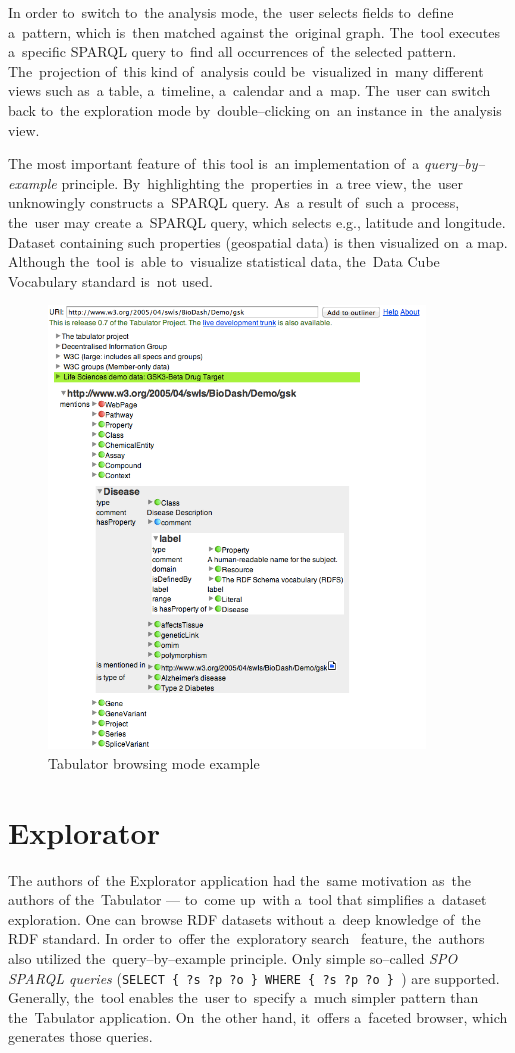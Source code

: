 In order to~switch to~the analysis mode, the~user selects fields to~define a~pattern, which is~then matched against the~original graph. The~tool executes a~specific SPARQL query to~find all occurrences of~the selected pattern. The~projection of~this kind of~analysis could be~visualized in~many different 
views such as~a table, a~timeline, a~calendar and a~map. The~user can switch back to~the 
exploration mode by~double--clicking on~an instance in~the analysis view.

The most important feature of~this tool is~an implementation of~a 
\emph{query--by--example} principle. By~highlighting the~properties in~a tree view, the~user 
unknowingly constructs a~SPARQL query. As~a 
result of~such a~process, the~user may create a~SPARQL query, which selects e.g., 
latitude and longitude. Dataset containing such properties (geospatial data)
is then visualized on~a map. Although the~tool is~able to~visualize statistical 
data, the~Data Cube Vocabulary standard is~not used.


\begin{figure}
	\centering
	\includegraphics[width=100mm]{img/tabulator.png}
	\caption{Tabulator browsing mode example}
	\label{fig:tabulator}
\end{figure}


\section{Explorator}
\label{sec:rw:explorator}
The authors of~the Explorator application had the~same motivation as~the authors 
of the~Tabulator --- to~come up~with a~tool that simplifies a~dataset 
exploration. One can browse RDF datasets without a~deep knowledge of~the RDF standard.
In order to~offer the~exploratory search~\cite{exploratory-search} feature, the~authors also
utilized the~query--by--example principle. Only simple so--called \emph{SPO SPARQL 
queries} (\texttt{SELECT \{ ?s ?p ?o \} WHERE \{ ?s ?p ?o \} }) are supported. Generally, the~tool 
enables the~user to~specify a~much simpler pattern than the~Tabulator 
application. On~the other hand, it~offers a~faceted browser, which generates 
those queries.

